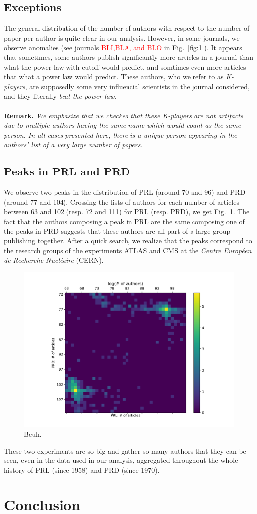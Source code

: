 \documentclass[aps,prl,floatfix,twocolumn]{revtex4-1}
\begin{document}
\subsection{Exceptions }
The general distribution of the number of authors with respect to the number of paper per author is quite clear in our analysis. 
However, in some journals, we observe anomalies (see journals \textcolor{red}{BLI,BLA, and BLO} in Fig.~\ref{fig:1}). 
It appears that sometimes, some authors publish significantly more articles in a journal than what the power law with cutoff would predict, and somtimes even more articles that what a power law would predict. 
These authors, who we refer to as \emph{K-players}, are supposedly some very influencial scientists in the journal considered, and they literally \emph{beat the power law}.

\paragraph{}
{\bf Remark.}\textit{
We emphasize that we checked that these K-players are not artifacts due to multiple authors having the same name which would count as the same person. 
In all cases presented here, there is a unique person appearing in the authors' list of a very large number of papers. 
}

\subsection{Peaks in PRL and PRD}
We observe two peaks in the distribution of PRL (around 70 and 96) and PRD (around 77 and 104). 
Crossing the lists of authors for each number of articles between 63 and 102 (resp. 72 and 111) for PRL (resp. PRD), we get Fig.~\ref{fig:prl_prd}. 
The fact that the authors composing a peak in PRL are the same composing one of the peaks in PRD suggests that these authors are all part of a large group publishing together. 
After a quick search, we realize that the peaks correspond to the research groups of the experiments ATLAS and CMS at the  \emph{Centre Europ\'een de Recherche Nucl\'eaire} (CERN). 
\begin{figure}
 \centering
 \includegraphics[width=.8\columnwidth]{../figures/prl_prd_log.pdf}
 \caption{Beuh.}
 \label{fig:prl_prd}
\end{figure}
These two experiments are so big and gather so many authors that they can be seen, even in the data used in our analysis, aggregated throughout the whole history of PRL (since 1958) and PRD (since 1970). 

\section{Conclusion}




\end{document}
